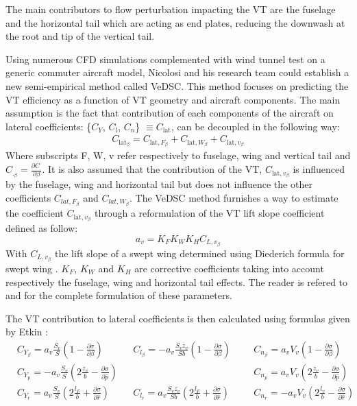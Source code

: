The main contributors to flow perturbation impacting the VT are the fuselage and the horizontal tail which are acting as end plates, reducing the downwash at the root and tip of the vertical tail. 

Using numerous CFD simulations complemented with wind tunnel test on a generic commuter aircraft model, Nicolosi and his research team could establish a new semi-empirical method called VeDSC. This method focuses on predicting the VT efficiency as a function of VT geometry and aircraft components. The main assumption is the fact that contribution of each components of the aircraft on lateral coefficients: \{$C_{Y}$, $C_{l}$, $C_{n}$\} $\equiv C_{\textrm{lat}}$, can be decoupled in the following way:
\begin{eqnarray}
C_{\textrm{lat}_\beta} = C_{\textrm{lat},F_\beta} + C_{\textrm{lat},W_\beta} + C_{\textrm{lat},v_\beta}
\end{eqnarray}
Where subscripts F, W, v refer respectively to fuselage, wing and vertical tail and $C_{._\beta}=\frac{\partial C_.}{\partial \beta}$. It is also assumed that the contribution of the VT, $C_{\textrm{lat},v_\beta}$ is influenced by the fuselage, wing and horizontal tail but does not influence the other coefficients $C_{lat,F_\beta}$ and $C_{lat,W_\beta}$.
The VeDSC method furnishes a way to estimate the coefficient $C_{\textrm{lat},v_\beta}$ through a reformulation of the VT lift slope coefficient defined as follow:
\begin{equation}
a_v=K_F K_W K_H C_{L,v_\beta}
\end{equation}
With $C_{L,v_\beta}$ the lift slope of a swept wing determined using Diederich formula for swept wing \cite{DiederichPlanformParameter}. $K_F$, $K_W$ and $K_H$ are corrective coefficients taking into account respectively the fuselage, wing and horizontal tail effects. The reader is refered to \cite{NicolosiVTDesignReview} and \cite{NicolosiDirectionalStabilityReviewofEmpiricalMethod} for the complete formulation of these parameters.

The VT contribution to lateral coefficients is then calculated using formulas given by Etkin \cite{Etkin}:
\begin{align}
&C_{Y_\beta} = a_v\frac{S_v}{S}\left( 1-\frac{\partial \sigma}{\partial \beta}\right) 
&&C_{l_\beta} =-a_v\frac{S_v z_v}{S b}\left( 1-\frac{\partial \sigma}{\partial \beta}\right) 
&&&C_{n_\beta} = a_v V_v\left( 1-\frac{\partial \sigma}{\partial \beta}\right)\\
&C_{Y_p} = -a_v\frac{S_v}{S}\left(2\frac{z_v}{b}-\frac{\partial \sigma}{\partial \hat{p}}\right) && \qquad &&&C_{n_p}= a_v V_v\left(2\frac{z_v}{b}-\frac{\partial \sigma}{\partial \hat{p}}\right)\\
&C_{Y_r} = a_v\frac{S_v}{S}\left( 2\frac{l_F}{b}+\frac{\partial \sigma}{\partial \hat{r}}\right)  &&C_{l_r} =a_v\frac{S_v z_v}{S b}\left( 2\frac{l_F}{b}+\frac{\partial \sigma}{\partial \hat{r}}\right) &&&C_{n_r} = -a_v V_v\left( 2\frac{l_v}{b}-\frac{\partial \sigma}{\partial \hat{r}}\right)
\end{align}

